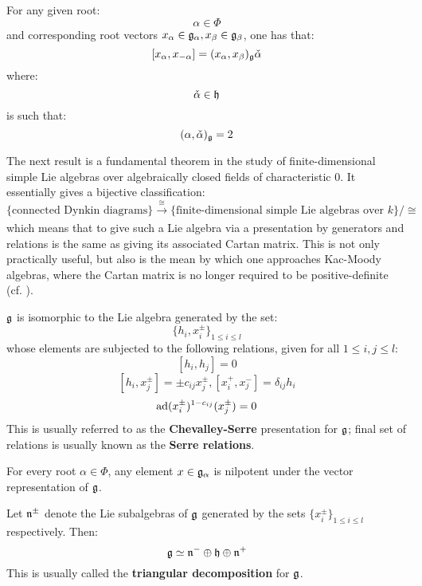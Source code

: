         \begin{corollary}
            For any given root:
                $$\alpha \in \Phi$$
            and corresponding root vectors $x_{\alpha} \in \mathfrak{g}_{\alpha}, x_{\beta} \in \mathfrak{g}_{\beta}$, one has that:
                $$[x_{\alpha}, x_{-\alpha}] = (x_{\alpha}, x_{\beta})_{\mathfrak{g}} \check{\alpha}$$
            where:
                $$\check{\alpha} \in \mathfrak{h}$$
            is such that:
                $$(\alpha, \check{\alpha})_{\mathfrak{g}} = 2$$
        \end{corollary}
        The next result is a fundamental theorem in the study of finite-dimensional simple Lie algebras over algebraically closed fields of characteristic $0$. It essentially gives a bijective classification:
            $$\{ \text{connected Dynkin diagrams} \} \xrightarrow[]{\cong} \{ \text{finite-dimensional simple Lie algebras over $k$} \}/\cong$$
        which means that to give such a Lie algebra via a presentation by generators and relations is the same as giving its associated Cartan matrix. This is not only practically useful, but also is the mean by which one approaches Kac-Moody algebras, where the Cartan matrix is no longer required to be positive-definite (cf. \cite[Chapters 1-5]{kac_infinite_dimensional_lie_algebras}). 
        \begin{theorem}
            $\mathfrak{g}$ is isomorphic to the Lie algebra generated by the set:
                $$\{h_i, x_i^{\pm}\}_{1 \leq i \leq l}$$
            whose elements are subjected to the following relations, given for all $1 \leq i, j \leq l$:
                $$[h_i, h_j] = 0$$
                $$[h_i, x_j^{\pm}] = \pm c_{ij} x_j^{\pm}, [x_i^+, x_j^-] = \delta_{ij} h_i$$
                $$\mathrm{ad}(x_i^{\pm})^{1 - c_{ij}}(x_j^{\pm}) = 0$$
            This is usually referred to as the \textbf{Chevalley-Serre} presentation for $\mathfrak{g}$; final set of relations is usually known as the \textbf{Serre relations}.
        \end{theorem}
        \begin{corollary}
            For every root $\alpha \in \Phi$, any element $x \in \mathfrak{g}_{\alpha}$ is nilpotent under the vector representation of $\mathfrak{g}$. 
        \end{corollary}
        \begin{corollary}
            Let $\mathfrak{n}^{\pm}$ denote the Lie subalgebras of $\mathfrak{g}$ generated by the sets $\{x_i^{\pm}\}_{1 \leq i \leq l}$ respectively. Then:
                $$\mathfrak{g} \simeq \mathfrak{n}^- \oplus \mathfrak{h} \oplus \mathfrak{n}^+$$
            This is usually called the \textbf{triangular decomposition} for $\mathfrak{g}$. 
        \end{corollary}

